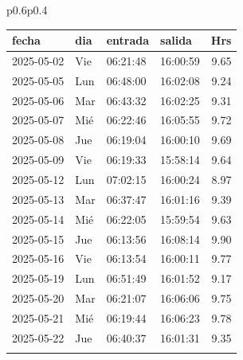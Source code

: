 \documentclass[11pt,a4paper]{article}
\newcommand{\mejoradatabla}[1]{
  \renewcommand{\arraystretch}{1.3}
  \setlength{\tabcolsep}{10pt}
#1
  \renewcommand{\arraystretch}{1}
  \setlength{\tabcolsep}{6pt}
}
\begin{document}
\begin{tabular}{p{}p{}}
\mejoradatabla{
\begin{tabular}{p{2cm} p{0.6cm} p{1.2cm} p{1.2cm} r}
\toprule
\rowcolor{grisclaro} \textbf{fecha} & \textbf{dia} & \textbf{entrada} & \textbf{salida} & \textbf{Hrs}\\
\midrule

\rowcolor{white}%
2025-05-02 & Vie & 06:21:48 & 16:00:59 &9.65\\
\rowcolor{white}%
2025-05-05 & Lun & 06:48:00 & 16:02:08 &9.24\\
\rowcolor{white}%
2025-05-06 & Mar & 06:43:32 & 16:02:25 &9.31\\
\rowcolor{white}%
2025-05-07 & Mié & 06:22:46 & 16:05:55 &9.72\\
\rowcolor{white}%
2025-05-08 & Jue & 06:19:04 & 16:00:10 &9.69\\
\rowcolor{white}%
2025-05-09 & Vie & 06:19:33 & 15:58:14 &9.64\\
\rowcolor{white}%
2025-05-12 & Lun & 07:02:15 & 16:00:24 &8.97\\
\rowcolor{white}%
2025-05-13 & Mar & 06:37:47 & 16:01:16 &9.39\\
\rowcolor{white}%
2025-05-14 & Mié & 06:22:05 & 15:59:54 &9.63\\
\rowcolor{white}%
2025-05-15 & Jue & 06:13:56 & 16:08:14 &9.90\\
\rowcolor{white}%
2025-05-16 & Vie & 06:13:54 & 16:00:11 &9.77\\
\rowcolor{white}%
2025-05-19 & Lun & 06:51:49 & 16:01:52 &9.17\\
\rowcolor{white}%
2025-05-20 & Mar & 06:21:07 & 16:06:06 &9.75\\
\rowcolor{white}%
2025-05-21 & Mié & 06:19:44 & 16:06:23 &9.78\\
\rowcolor{white}%
2025-05-22 & Jue & 06:40:37 & 16:01:31 &9.35\\
\rowcolor{white}%

\end{tabular}}
\end{tabular}
\end{document}
